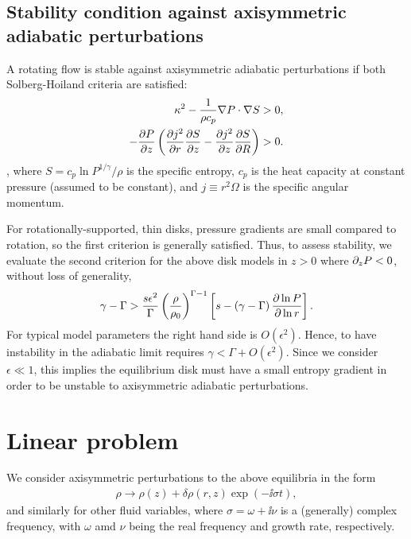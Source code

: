 \subsection{Stability condition against axisymmetric adiabatic
  perturbations}\label{solberg}
A rotating flow is stable against axisymmetric adiabatic perturbations
if both Solberg-Hoiland criteria  are satisfied:
\begin{align}
  \kappa^2 - \frac{1}{\rho c_p}\nabla P \cdot \nabla S &> 0,\\
  -\frac{\partial P}{\partial z}\left(\frac{\partial j^2}{\partial r}\frac{\partial S}{ \partial z} -
    \frac{\partial j^2}{\partial z}\frac{\partial S}{\partial R} \right)&>0.  
\end{align}
\citep{tassoul78}, where $S = c_p\ln{P^{1/\gamma}/\rho}$ is the
specific entropy, $c_p$ is the heat capacity at constant
pressure (assumed to be constant), and $j\equiv r^2\Omega$ is the
specific angular momentum.   

For rotationally-supported, thin disks, pressure gradients are small 
compared to rotation, so the first criterion is generally
satisfied. Thus, to assess stability, we evaluate the second criterion
for the above disk models in $z>0$ where $\partial_zP<0$, without loss of
generality,   
\begin{align}\label{solberg2}
  \gamma - \Gamma > \frac{s\epsilon^2}{\Gamma}
  \left(\frac{\rho}{\rho_0}\right)^{\Gamma-1} \left[s
    -\left(\gamma-\Gamma\right)\frac{\partial\ln{P}}{\partial\ln{r}} \right]. 
\end{align} 
For typical model parameters the right hand side is
$O(\epsilon^2)$. Hence, to have instability in the adiabatic limit 
requires $\gamma < \Gamma + O(\epsilon^2)$. Since we consider
$\epsilon\ll1$, this implies the equilibrium disk must have a small
entropy gradient in order to be unstable to axisymmetric adiabatic
perturbations. 

\section{Linear problem} 
We consider axisymmetric perturbations to the above equilibria in the
form 
\begin{align}
  \rho \to \rho(z) + \delta\rho(r,z)\exp{\left( - \ii\sigma
      t\right)},    
\end{align}
and similarly for other fluid variables, where $\sigma = \omega + \ii
\nu$ is a (generally) complex frequency, with $\omega$ amd $\nu$ being
the real frequency and growth rate, respectively.


